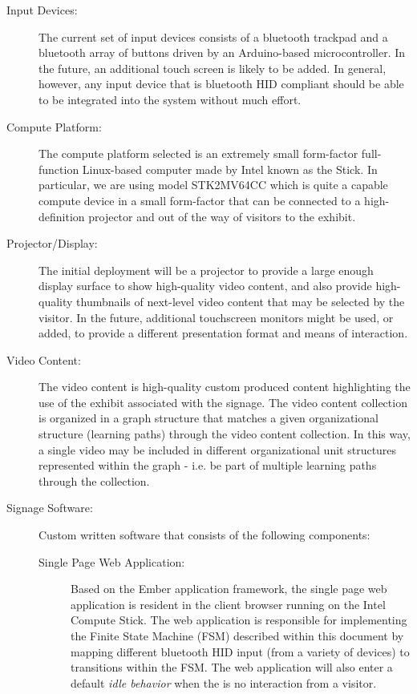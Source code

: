 \documentclass[10pt]{article}
\begin{document}
\begin{description}
	\item[Input Devices:] The current set of input devices consists of a bluetooth trackpad and a bluetooth array of buttons driven by an Arduino-based microcontroller. In the future, an additional touch screen is likely to be added. In general, however, any input device that is bluetooth HID compliant should be able to be integrated into the system without much effort. 
	
	\item[Compute Platform:] The compute platform selected is an extremely small form-factor full-function Linux-based computer made by Intel known as the Stick. In particular, we are using model STK2MV64CC which is quite a capable compute device in a small form-factor that can be connected to a high-definition projector and out of the way of visitors to the exhibit. 
	
	\item[Projector/Display:] The initial deployment will be a projector to provide a large enough display surface to show high-quality video content, and also provide high-quality thumbnails of next-level video content that may be selected by the visitor. In the future, additional touchscreen monitors might be used, or added, to provide a different presentation format and means of interaction.
	
	\item[Video Content:] The video content is high-quality custom produced content highlighting the use of the exhibit associated with the signage. The video content collection is organized in a graph structure that matches a given organizational structure (learning paths) through the video content collection. In this way, a single video may be included in different organizational unit structures represented within the graph - i.e. be part of multiple learning paths through the collection.
	
	\item[Signage Software:] Custom written software that consists of the following components: 
	\begin{description}
		\item[Single Page Web Application:] Based on the Ember application framework, the single page web application is resident in the client browser running on the Intel Compute Stick. The web application is responsible for implementing the Finite State Machine (FSM) described within this document by mapping different bluetooth HID input (from a variety of devices) to transitions within the FSM. The web application will also enter a default \emph{idle behavior\/} when the is no interaction from a visitor.
		

\end{description}
\end{description}
\end{document}
